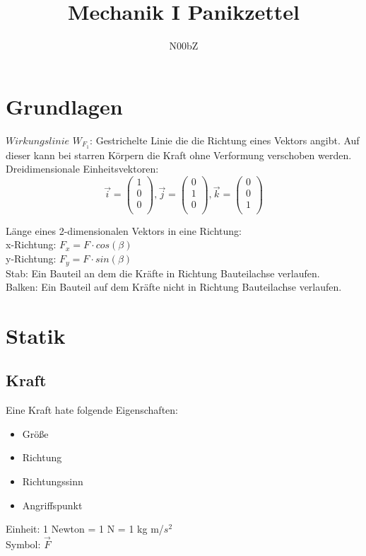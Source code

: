 \documentclass[a4paper,parskip=half*,DIV=7,fontsize=11pt]{scrartcl}
\title{Mechanik I Panikzettel}
\author{N00bZ}
\begin{document}
\maketitle

\tableofcontents

\pagebreak

\section{Grundlagen}
$\textit{Wirkungslinie}$ $W_{F_1}$: Gestrichelte Linie die die Richtung eines Vektors angibt. Auf dieser kann bei starren Körpern die Kraft ohne Verformung verschoben werden.\\

Dreidimensionale Einheitsvektoren: $$\overrightarrow{i}=\begin{pmatrix}
1\\
0\\
0\\
\end{pmatrix},\overrightarrow{j}=\begin{pmatrix}
0\\
1\\
0\\
\end{pmatrix},\overrightarrow{k}=\begin{pmatrix}
0\\
0\\
1\\
\end{pmatrix}$$

Länge eines 2-dimensionalen Vektors in eine Richtung:\\
x-Richtung: $F_x=F \cdot cos(\beta)$\\
y-Richtung: $F_y=F \cdot sin(\beta)$\\

Stab: Ein Bauteil an dem die Kräfte in Richtung Bauteilachse verlaufen.\\

Balken: Ein Bauteil auf dem Kräfte nicht in Richtung Bauteilachse verlaufen.\\


\pagebreak

\section{Statik}
\subsection{Kraft}
Eine Kraft hate folgende Eigenschaften:\\
\begin{itemize}
	\item Größe
	\item Richtung
	\item Richtungssinn
	\item Angriffspunkt
\end{itemize}
Einheit: 1 Newton = 1 N = 1 kg m/$s^2$\\
Symbol: $\overrightarrow{F}$\\
\end{document}
